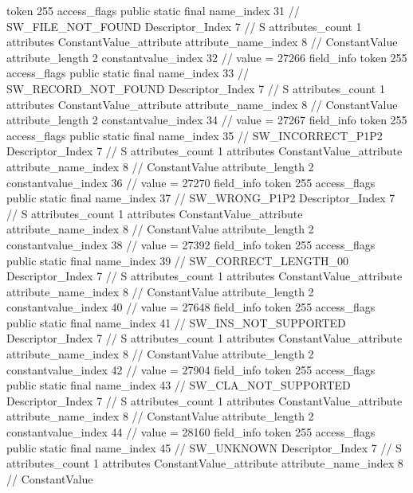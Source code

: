 {{{{{				token	255
				access_flags	public static final
				name_index	31		// SW_FILE_NOT_FOUND
				Descriptor_Index	7		// S
				attributes_count	1
				attributes {
				ConstantValue_attribute {
					attribute_name_index	8		// ConstantValue
					attribute_length	2
					constantvalue_index	32		// value = 27266
				}
				}
			}
			field_info {
				token	255
				access_flags	public static final
				name_index	33		// SW_RECORD_NOT_FOUND
				Descriptor_Index	7		// S
				attributes_count	1
				attributes {
				ConstantValue_attribute {
					attribute_name_index	8		// ConstantValue
					attribute_length	2
					constantvalue_index	34		// value = 27267
				}
				}
			}
			field_info {
				token	255
				access_flags	public static final
				name_index	35		// SW_INCORRECT_P1P2
				Descriptor_Index	7		// S
				attributes_count	1
				attributes {
				ConstantValue_attribute {
					attribute_name_index	8		// ConstantValue
					attribute_length	2
					constantvalue_index	36		// value = 27270
				}
				}
			}
			field_info {
				token	255
				access_flags	public static final
				name_index	37		// SW_WRONG_P1P2
				Descriptor_Index	7		// S
				attributes_count	1
				attributes {
				ConstantValue_attribute {
					attribute_name_index	8		// ConstantValue
					attribute_length	2
					constantvalue_index	38		// value = 27392
				}
				}
			}
			field_info {
				token	255
				access_flags	public static final
				name_index	39		// SW_CORRECT_LENGTH_00
				Descriptor_Index	7		// S
				attributes_count	1
				attributes {
				ConstantValue_attribute {
					attribute_name_index	8		// ConstantValue
					attribute_length	2
					constantvalue_index	40		// value = 27648
				}
				}
			}
			field_info {
				token	255
				access_flags	public static final
				name_index	41		// SW_INS_NOT_SUPPORTED
				Descriptor_Index	7		// S
				attributes_count	1
				attributes {
				ConstantValue_attribute {
					attribute_name_index	8		// ConstantValue
					attribute_length	2
					constantvalue_index	42		// value = 27904
				}
				}
			}
			field_info {
				token	255
				access_flags	public static final
				name_index	43		// SW_CLA_NOT_SUPPORTED
				Descriptor_Index	7		// S
				attributes_count	1
				attributes {
				ConstantValue_attribute {
					attribute_name_index	8		// ConstantValue
					attribute_length	2
					constantvalue_index	44		// value = 28160
				}
				}
			}
			field_info {
				token	255
				access_flags	public static final
				name_index	45		// SW_UNKNOWN
				Descriptor_Index	7		// S
				attributes_count	1
				attributes {
				ConstantValue_attribute {
					attribute_name_index	8		// ConstantValue
}}}}}}}
